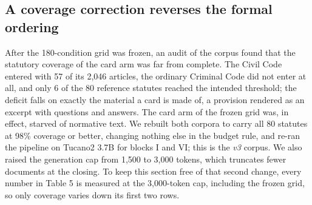 \documentclass{IOS-Book-Article}
\begin{document}
\subsection{A coverage correction reverses the formal ordering}
After the 180-condition grid was frozen, an audit of the corpus found that the statutory coverage of the card arm was far from complete. The Civil Code entered with 57 of its 2,046 articles, the ordinary Criminal Code did not enter at all, and only 6 of the 80 reference statutes reached the intended threshold; the deficit falls on exactly the material a card is made of, a provision rendered as an excerpt with questions and answers. The card arm of the frozen grid was, in effect, starved of normative text. We rebuilt both corpora to carry all 80 statutes at 98\% coverage or better, changing nothing else in the budget rule, and re-ran the pipeline on Tucano2 3.7B for blocks I and VI; this is the \emph{v3} corpus. We also raised the generation cap from 1,500 to 3,000 tokens, which truncates fewer documents at the closing. To keep this section free of that second change, every number in Table 5 is measured at the 3,000-token cap, including the frozen grid, so only coverage varies down its first two rows.
\end{document}

